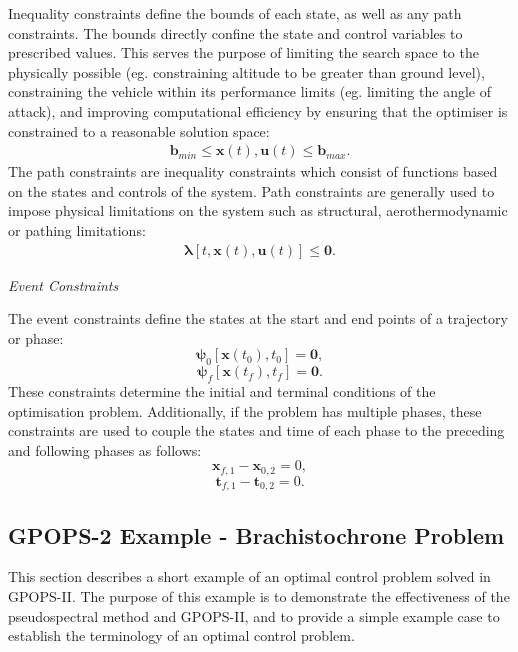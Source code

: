 \noindent Inequality constraints define the bounds of each state, as well as any path constraints.
The bounds directly confine the state and control variables to prescribed values. This serves the purpose of limiting the search space to the physically possible (eg. constraining altitude to be greater than ground level), constraining the vehicle within its performance limits (eg. limiting the angle of attack), and improving computational efficiency by ensuring that the optimiser is constrained to a reasonable solution space:
\begin{eqnarray}
\mathbf{b}_{min} \leq \textbf{x}(t),\textbf{u}(t) \leq \mathbf{b}_{max}.
\end{eqnarray}
The path constraints are inequality constraints which consist of functions based on the states and controls of the system. Path constraints are generally used to impose physical limitations on the system such as structural, aerothermodynamic or pathing limitations:
\begin{eqnarray}
\mathbf{\lambda}[t,\textbf{x}(t),\textbf{u}(t)] \leq \textbf{0}.
\end{eqnarray}

\noindent \textit{Event Constraints}

\noindent The event constraints define the states at the start and end points of a trajectory or phase:
\begin{equation}
\mathbf{\psi}_0[\textbf{x}(t_{0}), t_{0}] = \textbf{0},
\end{equation}
\begin{equation} \label{eq:2}
\mathbf{\psi}_f[\textbf{x}(t_{f}), t_{f}] = \textbf{0}.
\end{equation}
These constraints determine the initial and terminal conditions of the optimisation problem. Additionally, if the problem has multiple phases, these constraints are used to couple the states and time of each phase to the preceding and following phases as follows:
\begin{equation}
\textbf{x}_{f,1} - \textbf{x}_{0,2} = 0,
\end{equation}
\begin{equation}
\textbf{t}_{f,1} - \textbf{t}_{0,2} = 0.
\end{equation}













\subsection{GPOPS-2 Example - Brachistochrone Problem}
This section describes a short example of an optimal control problem solved in GPOPS-II. The purpose of this example is to demonstrate the effectiveness of the pseudospectral method and GPOPS-II, and to provide a simple example case to establish the terminology of an optimal control problem.  


